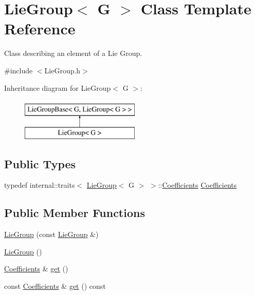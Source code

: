 \hypertarget{class_lie_group}{}\section{Lie\+Group$<$ G $>$ Class Template Reference}
\label{class_lie_group}


Class describing an element of a Lie Group.  




{\ttfamily \#include $<$Lie\+Group.\+h$>$}

Inheritance diagram for Lie\+Group$<$ G $>$\+:\begin{figure}[H]
\begin{center}
\leavevmode
\includegraphics[height=2.000000cm]{class_lie_group}
\end{center}
\end{figure}
\subsection*{Public Types}
\begin{DoxyCompactItemize}
\item 
typedef internal\+::traits$<$ \hyperlink{class_lie_group}{Lie\+Group}$<$ G $>$ $>$\+::\hyperlink{class_lie_group_a52de3c5adb933cbfa694b51bef656d5d}{Coefficients} \hyperlink{class_lie_group_a52de3c5adb933cbfa694b51bef656d5d}{Coefficients}
\end{DoxyCompactItemize}
\subsection*{Public Member Functions}
\begin{DoxyCompactItemize}
\item 
\hyperlink{class_lie_group_a9c6f35315929138296ec52903f347bff}{Lie\+Group} (const \hyperlink{class_lie_group}{Lie\+Group} \&)
\item 
\hyperlink{class_lie_group_ac831365f2877426d28524f26ab771525}{Lie\+Group} ()
\item 
\hyperlink{class_lie_group_a52de3c5adb933cbfa694b51bef656d5d}{Coefficients} \& \hyperlink{class_lie_group_ac8a00eee2b7425186ddf51dbf2e62f14}{get} ()
\item 
const \hyperlink{class_lie_group_a52de3c5adb933cbfa694b51bef656d5d}{Coefficients} \& \hyperlink{class_lie_group_aa551249eab20e2ba4778fc4753e09fd0}{get} () const
\end{DoxyCompactItemize}
